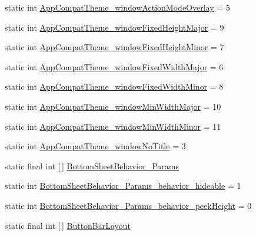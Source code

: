 \begin{DoxyCompactItemize}
\item 
static int \hyperlink{classandroid_1_1support_1_1v7_1_1cardview_1_1R_1_1styleable_a2e20d285d36c8aee404b1d719af3b081}{App\+Compat\+Theme\+\_\+window\+Action\+Mode\+Overlay} = 5
\item 
static int \hyperlink{classandroid_1_1support_1_1v7_1_1cardview_1_1R_1_1styleable_af7d8d8ae32e20793c811cd2892bd854b}{App\+Compat\+Theme\+\_\+window\+Fixed\+Height\+Major} = 9
\item 
static int \hyperlink{classandroid_1_1support_1_1v7_1_1cardview_1_1R_1_1styleable_aab3ebd33291947ab919499cc329066b8}{App\+Compat\+Theme\+\_\+window\+Fixed\+Height\+Minor} = 7
\item 
static int \hyperlink{classandroid_1_1support_1_1v7_1_1cardview_1_1R_1_1styleable_a37df104b2e08a0fd323610c8ceb0e98a}{App\+Compat\+Theme\+\_\+window\+Fixed\+Width\+Major} = 6
\item 
static int \hyperlink{classandroid_1_1support_1_1v7_1_1cardview_1_1R_1_1styleable_a945c5aca64da7f328f2b9028ae826f73}{App\+Compat\+Theme\+\_\+window\+Fixed\+Width\+Minor} = 8
\item 
static int \hyperlink{classandroid_1_1support_1_1v7_1_1cardview_1_1R_1_1styleable_a3d9fe7753815eb3cf40acf6790e1dd68}{App\+Compat\+Theme\+\_\+window\+Min\+Width\+Major} = 10
\item 
static int \hyperlink{classandroid_1_1support_1_1v7_1_1cardview_1_1R_1_1styleable_aa1098644aec6afc914db566e8faa7357}{App\+Compat\+Theme\+\_\+window\+Min\+Width\+Minor} = 11
\item 
static int \hyperlink{classandroid_1_1support_1_1v7_1_1cardview_1_1R_1_1styleable_af1f90e0bb899d8d3fc975f88951bf9c2}{App\+Compat\+Theme\+\_\+window\+No\+Title} = 3
\item 
static final int \mbox{[}$\,$\mbox{]} \hyperlink{classandroid_1_1support_1_1v7_1_1cardview_1_1R_1_1styleable_a2c7e34ab9878226fa3cb5d06e0b274a8}{Bottom\+Sheet\+Behavior\+\_\+\+Params}
\item 
static int \hyperlink{classandroid_1_1support_1_1v7_1_1cardview_1_1R_1_1styleable_a3fb8831fef78b8f4d978262776c7b3f8}{Bottom\+Sheet\+Behavior\+\_\+\+Params\+\_\+behavior\+\_\+hideable} = 1
\item 
static int \hyperlink{classandroid_1_1support_1_1v7_1_1cardview_1_1R_1_1styleable_a837e9a3aff36cd40661b35572539903d}{Bottom\+Sheet\+Behavior\+\_\+\+Params\+\_\+behavior\+\_\+peek\+Height} = 0
\item 
static final int \mbox{[}$\,$\mbox{]} \hyperlink{classandroid_1_1support_1_1v7_1_1cardview_1_1R_1_1styleable_aaef402690ee9d9aa4bf6e3b5b46f95dd}{Button\+Bar\+Layout}

\end{DoxyCompactItemize}

